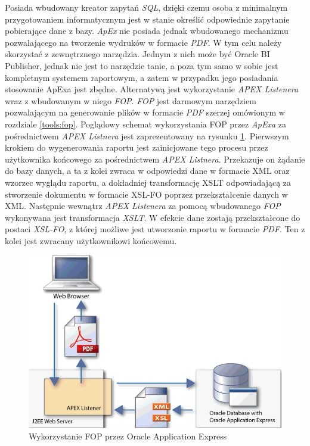 \documentclass[11pt,a4paper]{article}
\begin{document}
 Posiada wbudowany kreator zapytań \emph{SQL}, dzięki czemu osoba z minimalnym przygotowaniem informatycznym jest w stanie określić odpowiednie zapytanie pobierające dane z bazy. \emph{ApEx} nie posiada jednak wbudowanego mechanizmu pozwalającego na tworzenie wydruków w formacie \emph{PDF}. W tym celu należy skorzystać z zewnętrznego narzędzia. Jednym z nich może być Oracle BI Publisher, jednak nie jest to narzędzie tanie, a poza tym samo w sobie jest kompletnym systemem raportowym, a zatem w przypadku jego posiadania stosowanie ApExa jest zbędne. Alternatywą jest wykorzystanie \emph{APEX Listenera} wraz z wbudowanym w niego \emph{FOP}. \emph{FOP} jest darmowym narzędziem pozwalającym na generowanie plików w formacie \emph{PDF} szerzej omówionym w rozdziale \ref{tools:fop}. Poglądowy schemat wykorzystania FOP przez \emph{ApExa} za pośrednictwem \emph{APEX Listnera} jest zaprezentowany na rysunku \ref{img:apex_fop}. Pierwszym krokiem do wygenerowania raportu jest zainicjowane tego procesu przez użytkownika końcowego za pośrednictwem \emph{APEX Listnera}. Przekazuje on żądanie do bazy danych, a ta z kolei zwraca w odpowiedzi dane w formacie XML oraz wzorzec wyglądu raportu, a dokładniej transformację XSLT odpowiadającą za stworzenie dokumentu w formacie XSL-FO poprzez przekształcenie danych w XML. Następnie wewnątrz \emph{APEX Listenera} za pomocą wbudowanego \emph{FOP} wykonywana jest transformacja \emph{XSLT}. W efekcie dane zostają przekształcone do postaci \emph{XSL-FO}, z której możliwe jest utworzonie raportu w formacie \emph{PDF}. Ten z kolei jest zwracany użytkownikowi końcowemu. 

\begin{figure}[h]
\centering
\includegraphics[scale=0.5]{apex_listener_fop}
\caption{Wykorzystanie FOP przez Oracle Application Express}
\label{img:apex_fop}
\end{figure}
\end{document}
